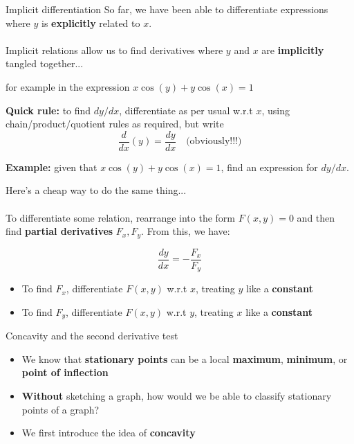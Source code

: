 \documentclass{beamer}
\begin{document}
\begin{frame}{Implicit differentiation}
	So far, we have been able to differentiate expressions where $y$ is \textbf{explicitly} related to $x$.
	\\~\\	
	Implicit relations allow us to find derivatives where $y$ and $x$ are \textbf{implicitly} tangled together... 
	\begin{center}for example in the expression $x \cos(y) + y\cos(x) = 1$\end{center}
	
	\textbf{Quick rule: } to find $dy/dx$, differentiate as per usual w.r.t $x$, using chain/product/quotient rules as required, but write 
	$$\dfrac{d}{dx}(y) = \dfrac{dy}{dx} \quad \text{(obviously!!!)}$$
\end{frame}

\begin{frame}
	\textbf{Example:} given that $x \cos(y) + y \cos(x) = 1$, find an expression for $dy/dx$.
	\vspace{5cm}
\end{frame}

\begin{frame}
	Here's a cheap way to do the same thing...\\~\\
	To differentiate some relation, rearrange into the form $F(x, y) = 0$ and then find \textbf{partial derivatives} $F_x, F_y$. From this, we have:
	
	$$\dfrac{dy}{dx} = -\dfrac{F_x}{F_y}$$

	\begin{itemize}
		\item To find $F_x$, differentiate $F(x, y)$ w.r.t $x$, treating $y$ like a \textbf{constant}
		\item To find $F_y$, differentiate $F(x, y)$ w.r.t $y$, treating $x$ like a \textbf{constant}
	\end{itemize}
\end{frame}

\begin{frame}{Concavity and the second derivative test}
	\begin{itemize}
		\item We know that \textbf{stationary points} can be a local \textbf{maximum}, \textbf{minimum}, or \textbf{point of inflection}
		\item \textbf{Without} sketching a graph, how would we be able to classify stationary points of a graph?
		\item We first introduce the idea of \textbf{concavity}
	\end{itemize}
\end{frame}
\end{document}

